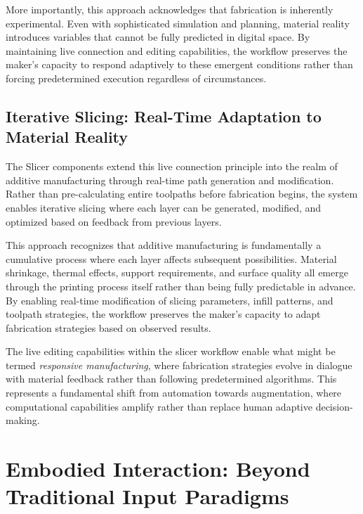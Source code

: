 \vspace{0.5cm}

More importantly, this approach acknowledges that fabrication is inherently experimental. Even with sophisticated simulation and planning, material reality introduces variables that cannot be fully predicted in digital space. By maintaining live connection and editing capabilities, the workflow preserves the maker's capacity to respond adaptively to these emergent conditions rather than forcing predetermined execution regardless of circumstances.

\subsection{Iterative Slicing: Real-Time Adaptation to Material Reality}

The Slicer components extend this live connection principle into the realm of additive manufacturing through real-time path generation and modification. Rather than pre-calculating entire toolpaths before fabrication begins, the system enables iterative slicing where each layer can be generated, modified, and optimized based on feedback from previous layers.

\vspace{0.5cm}

This approach recognizes that additive manufacturing is fundamentally a cumulative process where each layer affects subsequent possibilities. Material shrinkage, thermal effects, support requirements, and surface quality all emerge through the printing process itself rather than being fully predictable in advance. By enabling real-time modification of slicing parameters, infill patterns, and toolpath strategies, the workflow preserves the maker's capacity to adapt fabrication strategies based on observed results.

\vspace{0.5cm}

The live editing capabilities within the slicer workflow enable what might be termed \textit{responsive manufacturing}, where fabrication strategies evolve in dialogue with material feedback rather than following predetermined algorithms. This represents a fundamental shift from automation towards augmentation, where computational capabilities amplify rather than replace human adaptive decision-making.

\section{Embodied Interaction: Beyond Traditional Input Paradigms}

